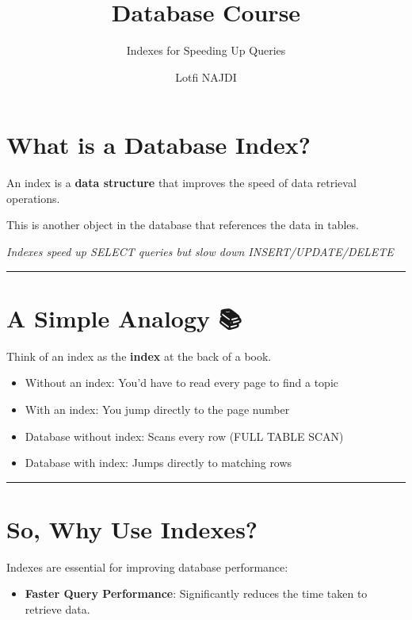 \documentclass[
]{report}
\title{Database Course}
\subtitle{Indexes for Speeding Up Queries}
\author{Lotfi NAJDI}
\date{}
\providecommand{\tightlist}{%
  \setlength{\itemsep}{0pt}\setlength{\parskip}{0pt}}\usepackage{longtable,booktabs,array}
\begin{document}
\maketitle


\section{What is a Database Index?}\label{what-is-a-database-index}

An index is a \textbf{data structure} that improves the speed of data
retrieval operations.

This is another object in the database that references the data in
tables.

\emph{Indexes speed up SELECT queries but slow down
INSERT/UPDATE/DELETE}

\begin{center}\rule{0.5\linewidth}{0.5pt}\end{center}

\section{A Simple Analogy 📚}\label{a-simple-analogy}

Think of an index as the \textbf{index} at the back of a book.

\begin{itemize}
\tightlist
\item
  Without an index: You'd have to read every page to find a topic
\item
  With an index: You jump directly to the page number
\item
  Database without index: Scans every row (FULL TABLE SCAN)
\item
  Database with index: Jumps directly to matching rows
\end{itemize}

\begin{center}\rule{0.5\linewidth}{0.5pt}\end{center}

\section{So, Why Use Indexes? 🚀}\label{so-why-use-indexes}

Indexes are essential for improving database performance:

\begin{itemize}
\tightlist
\item
  \textbf{Faster Query Performance}: Significantly reduces the time
  taken to retrieve data.
\end{itemize}
\end{document}
